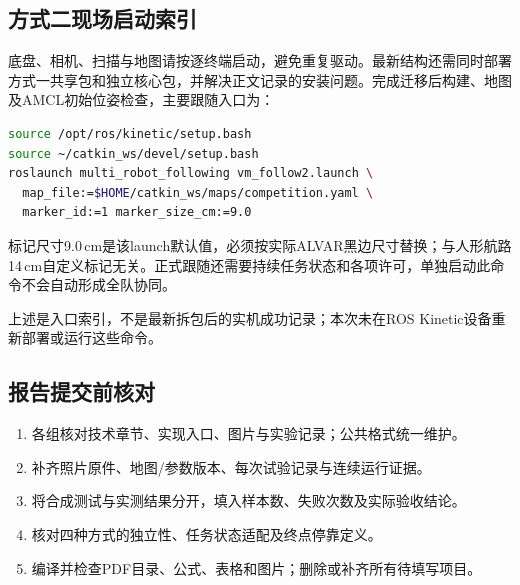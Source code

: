 \subsection{方式二现场启动索引}
底盘、相机、扫描与地图请按逐终端启动，避免重复驱动。最新结构还需同时部署方式一共享包和独立核心包，并解决正文记录的安装问题。完成迁移后构建、地图及AMCL初始位姿检查，主要跟随入口为：
\begin{lstlisting}[language=bash]
source /opt/ros/kinetic/setup.bash
source ~/catkin_ws/devel/setup.bash
roslaunch multi_robot_following vm_follow2.launch \
  map_file:=$HOME/catkin_ws/maps/competition.yaml \
  marker_id:=1 marker_size_cm:=9.0
\end{lstlisting}
标记尺寸9.0\,cm是该launch默认值，必须按实际ALVAR黑边尺寸替换；与人形航路14\,cm自定义标记无关。正式跟随还需要持续任务状态和各项许可，单独启动此命令不会自动形成全队协同。

上述是入口索引，不是最新拆包后的实机成功记录；本次未在ROS Kinetic设备重新部署或运行这些命令。

\subsection{报告提交前核对}
\begin{enumerate}
\item 各组核对技术章节、实现入口、图片与实验记录；公共格式统一维护。
\item 补齐照片原件、地图/参数版本、每次试验记录与连续运行证据。
\item 将合成测试与实测结果分开，填入样本数、失败次数及实际验收结论。
\item 核对四种方式的独立性、任务状态适配及终点停靠定义。
\item 编译并检查PDF目录、公式、表格和图片；删除或补齐所有待填写项目。
\end{enumerate}
